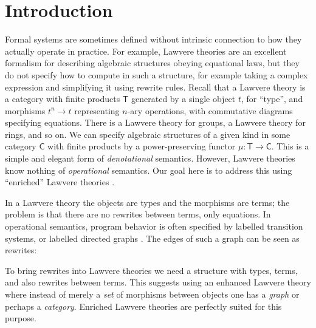 \documentclass{amsart}
\theoremstyle{definition}
\newcommand{\C}{\mathsf{C}}
\newcommand{\T}{\mathsf{T}}
\newcommand{\maps}{\colon}
\begin{document}
\section{Introduction}


Formal systems are sometimes defined without intrinsic connection to how they actually operate in practice.   For example, Lawvere theories  \cite{lawvere} are an excellent formalism for describing algebraic structures obeying equational laws, but they do not specify how to compute 
in such a structure, for example taking a complex expression and simplifying it using rewrite rules.   Recall that a Lawvere theory is a category with finite products $\T$ generated by a single object $t$, for ``type'', and morphisms $t^n \to t$ representing $n$-ary operations, with commutative diagrams specifying equations.   There is a Lawvere theory for groups, a Lawvere theory for rings, and so on.   We can specify algebraic structures of a given kind in some category $\C$ with finite products by a power-preserving functor $\mu \maps\T \to \C$.   This is a simple and elegant form of \emph{denotational} semantics.    However, Lawvere theories know nothing of \emph{operational} semantics.  Our goal here is to address this using ``enriched'' Lawvere theories \cite{enrich}.

In a Lawvere theory the objects are types and the morphisms are terms; the problem is that
there are no rewrites between terms, only equations.   In operational semantics, program behavior is often specified by labelled transition systems, or labelled directed graphs \cite{sos}.  The edges of such a graph can be seen as rewrites:
\begin{center}\end{center}
To bring rewrites into Lawvere theories we need a structure with types, terms, and also rewrites
between terms.   This suggests using an enhanced Lawvere theory where instead of merely
a \emph{set} of morphisms between objects one has a \emph{graph} or perhaps a \emph{category}. Enriched Lawvere theories are perfectly suited for this purpose.
\end{document}
